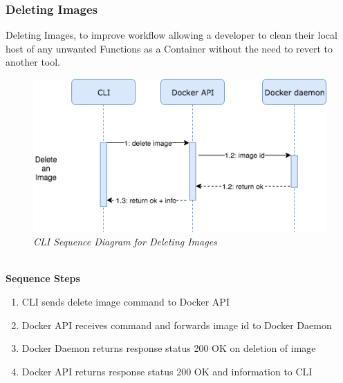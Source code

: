 \subsubsection{Deleting Images}
Deleting Images, to improve workflow allowing a developer to clean their local host of any unwanted Functions as a Container without the need to revert to another tool.
\begin{figure}[!hb]
\centering
\includegraphics*[width=1\textwidth]{images/sec-delete-img.png}
\caption{\em CLI Sequence Diagram for Deleting Images}
\label{img:cli_seq4}
\end{figure}
\\\textbf{Sequence Steps}
\begin{enumerate}
  \item CLI sends delete image command to Docker API
  \item Docker API receives command and forwards image id to Docker Daemon
  \item Docker Daemon returns response status 200 OK on deletion of image
  \item Docker API returns response status 200 OK and information to CLI
\end{enumerate}
\clearpage

